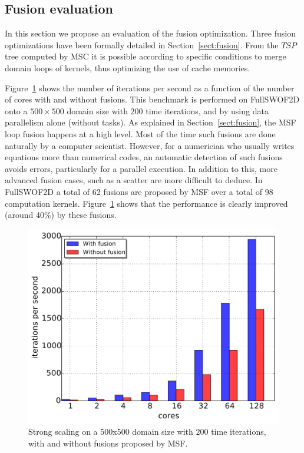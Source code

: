 \subsection{Fusion evaluation}
\label{sect:fus}

In this section we propose an evaluation of the fusion optimization. Three fusion optimizations
%
have been formally detailed in Section~\ref{sect:fusion}. From the $TSP$ tree computed by MSC it is possible according to specific conditions to merge domain loops of kernels, thus optimizing the use of cache memories.

Figure~\ref{fig:fusion} shows the number of iterations per second as a function of the number of cores with and without fusions. This benchmark is performed on FullSWOF2D onto a $500 \times 500$ domain size with $200$ time iterations, and by using data parallelism alone (without tasks). As explained in Section~\ref{sect:fusion}, the MSF loop fusion happens at a high level. Most of the time such fusions are done naturally by a computer scientist. However, for a numerician who usually writes equations more than numerical codes, an automatic detection of such fusions avoids errors, particularly for a parallel execution. In addition to this, more advanced fusion cases, such as a scatter are more difficult to deduce. In FullSWOF2D a total of  62 fusions are proposed by MSF over a total of 98 computation kernels. Figure~\ref{fig:fusion} shows that the performance is clearly improved (around 40\%) by these fusions.

\begin{figure}[!h]\begin{center}
  \includegraphics[width=.6\textwidth]{../results/task_scaling/500_200/fusVSbase.pdf}
  \caption{Strong scaling on a 500x500 domain size with $200$ time iterations, with and without fusions proposed by MSF.}
  \label{fig:fusion}
\end{center}\end{figure}

